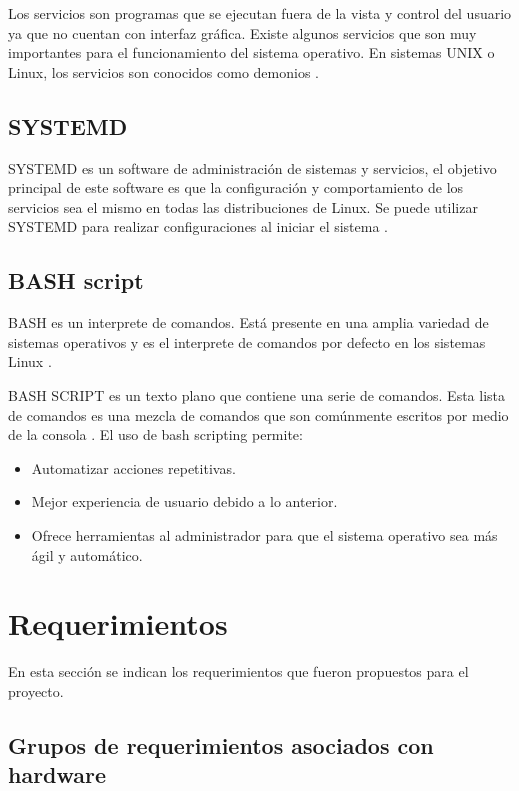Los servicios son programas que se ejecutan fuera de la vista y control del usuario ya que no cuentan con interfaz gráfica. Existe algunos servicios que son muy importantes para el funcionamiento del sistema operativo.
En sistemas UNIX o Linux, los servicios son conocidos como demonios \citep{SERVICIO}.

\subsection{SYSTEMD}

SYSTEMD es un software de administración de sistemas y servicios, el objetivo principal de este software es que la configuración y comportamiento de los servicios sea el mismo en todas las distribuciones de Linux. Se puede utilizar SYSTEMD para realizar configuraciones al iniciar el sistema \citep{REFSYSTEMD}.

\subsection{BASH script}
BASH es un interprete de comandos. Está presente en una amplia variedad de sistemas operativos y es el interprete de comandos por defecto en los sistemas Linux \citep{BASH}. 


BASH SCRIPT es un texto plano que contiene una serie de comandos. Esta lista de comandos es una mezcla de comandos que son comúnmente escritos por medio de la consola \citep{BASHSCRIPT}. El uso de bash scripting permite:

\begin{itemize}
\item Automatizar acciones repetitivas.
\item Mejor experiencia de usuario debido a lo anterior.
\item Ofrece herramientas al administrador para que el sistema operativo sea más ágil y automático.
\end{itemize}

\section{Requerimientos}
En esta sección se indican los requerimientos que fueron propuestos para el proyecto.

\subsection{Grupos de requerimientos asociados con hardware}

